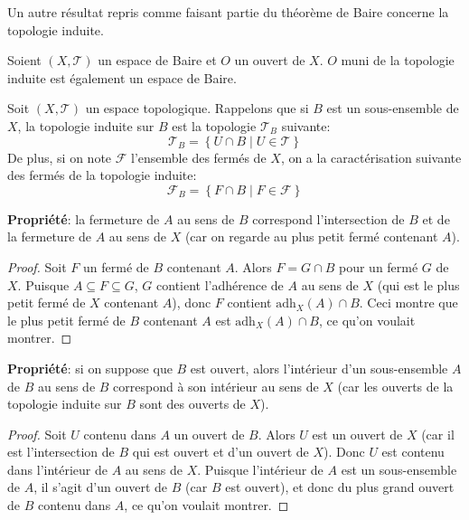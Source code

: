 Un autre résultat repris comme faisant partie du théorème de Baire concerne
la topologie induite.
\begin{thm}\label{baire:ind}
  Soient $(X, \mathcal{T})$ un espace de Baire et $O$ un ouvert de $X$.
  $O$ muni de la topologie induite est également un espace de Baire.
\end{thm}

\begin{rem}[Rappels]
  Soit $(X, \mathcal{T})$ un espace topologique.
  Rappelons que si $B$ est un sous-ensemble de $X$, la topologie
  induite sur $B$ est la topologie $\mathcal{T}_B$ suivante:
  $$\mathcal{T}_B=\left\{U\cap B\mid U\in\mathcal{T}\right\}$$
  De plus, si on note $\mathcal{F}$ l'ensemble des fermés de $X$,
  on a la caractérisation suivante des fermés de la topologie
  induite:
  $$\mathcal{F}_B=\left\{F\cap B\mid F\in\mathcal{F}\right\}$$

  \textbf{Propriété}: la fermeture de $A$ au sens de $B$ correspond
  l'intersection de $B$ et de la fermeture de $A$ au sens
  de $X$ (car on regarde au plus petit fermé contenant $A$).

  \begin{proof}
  Soit $F$ un fermé de $B$ contenant $A$. Alors
  $F = G\cap B$ pour un fermé $G$ de $X$.
  Puisque $ A \subseteq F\subseteq G$, $G$ contient
  l'adhérence de $A$ au sens de $X$
  (qui est le plus petit fermé de $X$
  contenant $A$), donc $F$ contient $\mathrm{adh}_X(A)\cap B$.
  Ceci montre que le plus petit fermé de $B$ contenant $A$
  est $\mathrm{adh}_X(A)\cap B$, ce qu'on voulait montrer.
\end{proof}

  \textbf{Propriété}: si on suppose que $B$ est ouvert, alors l'intérieur d'un
  sous-ensemble $A$ de $B$ au sens de $B$ correspond à
  son intérieur au sens de $X$
  (car les ouverts de la topologie induite sur $B$ sont des
  ouverts de $X$).

  \begin{proof}
    Soit $U$ contenu dans $A$ un ouvert de $B$. Alors $U$ est un
    ouvert de $X$ (car il est l'intersection de $B$ qui est ouvert
    et d'un ouvert de $X$). Donc $U$ est contenu dans l'intérieur
    de $A$ au sens de $X$. Puisque l'intérieur de $A$ est un sous-ensemble
    de $A$, il s'agit d'un ouvert de $B$ (car $B$ est ouvert),
    et donc du plus grand
    ouvert de $B$ contenu dans $A$, ce qu'on voulait montrer.
    \end{proof}
\end{rem}

